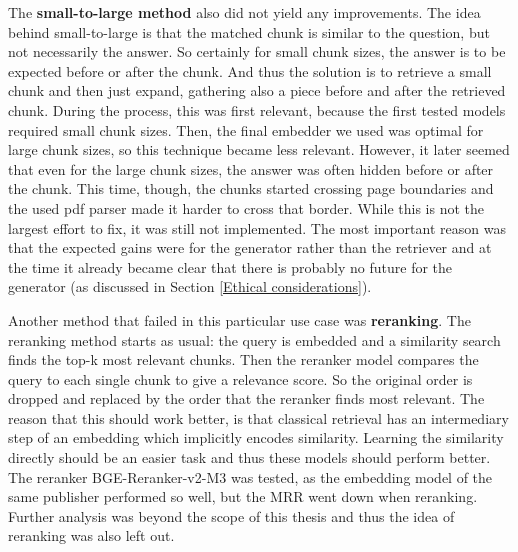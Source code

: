 The \textbf{small-to-large method} also did not yield any improvements. The idea behind small-to-large is that the matched chunk is similar to the question, but not necessarily the answer. So certainly for small chunk sizes, the answer is to be expected before or after the chunk. And thus the solution is to retrieve a small chunk and then just expand, gathering also a piece before and after the retrieved chunk. During the process, this was first relevant, because the first tested models required small chunk sizes. Then, the final embedder we used was optimal for large chunk sizes, so this technique became less relevant. However, it later seemed that even for the large chunk sizes, the answer was often hidden before or after the chunk. This time, though, the chunks started crossing page boundaries and the used pdf parser made it harder to cross that border. While this is not the largest effort to fix, it was still not implemented. The most important reason was that the expected gains were for the generator rather than the retriever and at the time it already became clear that there is probably no future for the generator (as discussed in Section \ref{Ethical considerations}).

Another method that failed in this particular use case was \textbf{reranking}. The reranking method starts as usual: the query is embedded and a similarity search finds the top-k most relevant chunks. Then the reranker model compares the query to each single chunk to give a relevance score. So the original order is dropped and replaced by the order that the reranker finds most relevant. The reason that this should work better, is that classical retrieval has an intermediary step of an embedding which implicitly encodes similarity. Learning the similarity directly should be an easier task and thus these models should perform better. The reranker BGE-Reranker-v2-M3 \cite{chen2024bge} was tested, as the embedding model of the same publisher performed so well, but the MRR went down when reranking. Further analysis was beyond the scope of this thesis and thus the idea of reranking was also left out.

